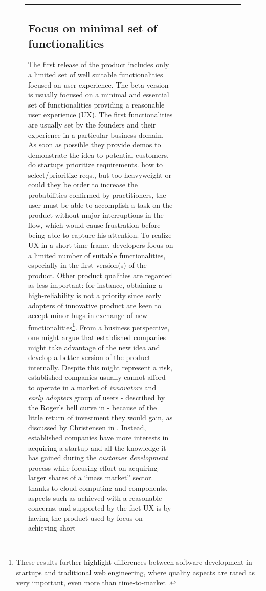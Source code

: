 \documentclass[12pt,journal,compsoc]{../sty/IEEEtran}
\begin{document}
\begin{table}[!t]
\begin{figure}[!t]
\begin{compactitem}
\begin{table}[!t]
\begin{tabular}{|l||c||c||c||c||c||c||c||c||c|}
\subsection{Focus on minimal set of functionalities} The first release of the
product includes only a limited set of well  suitable functionalities focused on
user experience. The beta version is usually  focused on a minimal and essential
set of functionalities providing a reasonable  user experience (UX). The first
functionalities are usually set by the founders and their experience in a
particular business domain. As soon as possible they provide demos to
demonstrate the idea to potential customers. %
do startups prioritize requirements.  %
how to select/prioritize reqs., but  %
too heavyweight or could they be  %
order to increase the probabilities  %
confirmed by practitioners, the user must be able to  accomplish a task on the
product without major interruptions in the flow, which  would cause frustration
before being able to capture his attention. To realize  UX in a short time
frame, developers focus on a limited number of suitable  functionalities,
especially in the first version(s) of the product. Other  product qualities are
regarded as less important: for instance, obtaining a  high-reliability is not a
priority since early adopters of innovative product  are keen to accept minor
bugs in exchange of new functionalities\footnote{These  results further
highlight differences between software development in startups  and traditional
web engineering, where quality aspects are rated as very  important, even more
than time-to-market \cite{Offutt2002}.}. From a business  perspective, one might
argue that established companies might take advantage of  the new idea and
develop a better version of the product internally. Despite this might represent
a risk, established companies usually cannot  afford to operate in a market of
\textit{innovators} and \textit{early adopters}  group of users - described by
the Roger's bell curve in \cite{Rogers} - because  of the little return of
investment they would gain, as discussed by Christensen  in
\cite{Christensen2003}. Instead, established companies have more interests  in
acquiring a startup and all the knowledge it has gained during the
\textit{customer development} process while focusing effort on acquiring larger
shares of a ``mass market'' sector.  %
thanks to cloud computing and  %
components, aspects such as  %
achieved with a reasonable  %
concerns, and supported by the fact  %
UX is by having the product used by  %
focus on achieving short  %


\end{tabular}
\end{table}
\end{compactitem}
\end{figure}
\end{table}
\end{document}
